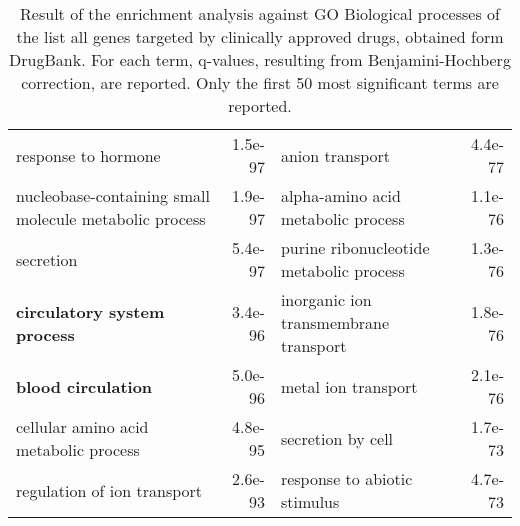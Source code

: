 \documentclass[fleqn,10pt]{SelfArx} %
\begin{document}
\begin{table}[!htb]
\begin{tabularx}{\textwidth}{lRlR}
		response to hormone & 1.5e-97 & anion transport & 4.4e-77 \\ 
		nucleobase-containing small molecule metabolic process & 1.9e-97 & alpha-amino acid metabolic process & 1.1e-76 \\ 
		secretion & 5.4e-97 & purine ribonucleotide metabolic process & 1.3e-76 \\ 
		\textbf{circulatory system process} & 3.4e-96 & inorganic ion transmembrane transport & 1.8e-76 \\ 
		\textbf{blood circulation} & 5.0e-96 & metal ion transport & 2.1e-76 \\ 
		cellular amino acid metabolic process & 4.8e-95 & secretion by cell & 1.7e-73 \\ 
		regulation of ion transport & 2.6e-93 & response to abiotic stimulus & 4.7e-73 \\ 
	\end{tabularx}
	\smallskip
	\caption{Result of the enrichment analysis against GO Biological processes of the list all genes targeted by clinically approved drugs, obtained form DrugBank. For each term, q-values, resulting from Benjamini-Hochberg correction, are reported. Only the first 50 most significant terms are reported.}
	\label{tab:bp2229}
\end{table}
\end{document}
